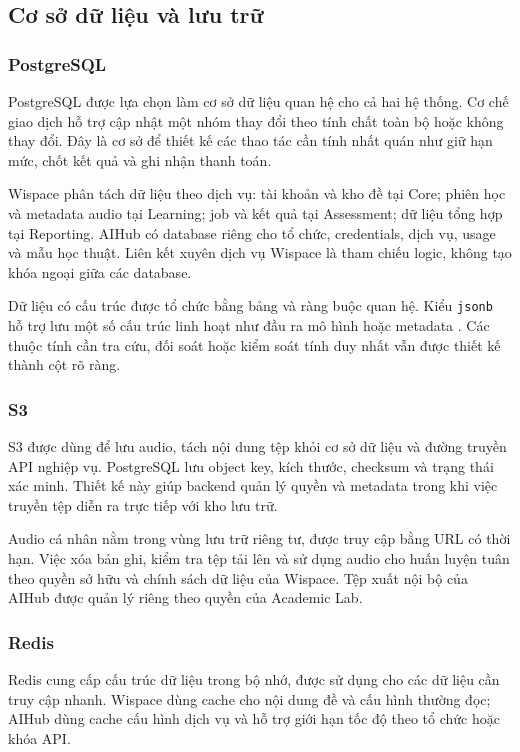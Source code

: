 \subsection{Cơ sở dữ liệu và lưu trữ}
\subsubsection{PostgreSQL}

PostgreSQL được lựa chọn làm cơ sở dữ liệu quan hệ cho cả hai hệ thống. Cơ chế giao dịch hỗ trợ cập nhật một nhóm thay đổi theo tính chất toàn bộ hoặc không thay đổi. Đây là cơ sở để thiết kế các thao tác cần tính nhất quán như giữ hạn mức, chốt kết quả và ghi nhận thanh toán.

Wispace phân tách dữ liệu theo dịch vụ: tài khoản và kho đề tại Core; phiên học và metadata audio tại Learning; job và kết quả tại Assessment; dữ liệu tổng hợp tại Reporting. AIHub có database riêng cho tổ chức, credentials, dịch vụ, usage và mẫu học thuật. Liên kết xuyên dịch vụ Wispace là tham chiếu logic, không tạo khóa ngoại giữa các database.

Dữ liệu có cấu trúc được tổ chức bằng bảng và ràng buộc quan hệ. Kiểu \texttt{jsonb} hỗ trợ lưu một số cấu trúc linh hoạt như đầu ra mô hình hoặc metadata \parencite{ch4_postgresql_json}. Các thuộc tính cần tra cứu, đối soát hoặc kiểm soát tính duy nhất vẫn được thiết kế thành cột rõ ràng.

\subsubsection{S3}

S3 được dùng để lưu audio, tách nội dung tệp khỏi cơ sở dữ liệu và đường truyền API nghiệp vụ. PostgreSQL lưu object key, kích thước, checksum và trạng thái xác minh. Thiết kế này giúp backend quản lý quyền và metadata trong khi việc truyền tệp diễn ra trực tiếp với kho lưu trữ.

Audio cá nhân nằm trong vùng lưu trữ riêng tư, được truy cập bằng URL có thời hạn. Việc xóa bản ghi, kiểm tra tệp tải lên và sử dụng audio cho huấn luyện tuân theo quyền sở hữu và chính sách dữ liệu của Wispace. Tệp xuất nội bộ của AIHub được quản lý riêng theo quyền của Academic Lab.

\subsubsection{Redis}

Redis cung cấp cấu trúc dữ liệu trong bộ nhớ, được sử dụng cho các dữ liệu cần truy cập nhanh. Wispace dùng cache cho nội dung đề và cấu hình thường đọc; AIHub dùng cache cấu hình dịch vụ và hỗ trợ giới hạn tốc độ theo tổ chức hoặc khóa API.

